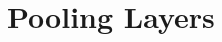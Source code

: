 \documentclass[modern]{aastex61}
\newcommand\aastex{AAS\TeX}
\begin{document}
\section{Pooling Layers} \label{sec:pool}

\appendix




\begin{thebibliography}{}

\end{thebibliography}


\end{document}

